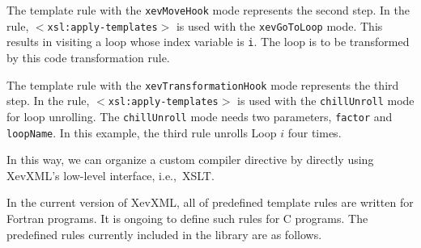 The template rule with the \texttt{xevMoveHook} mode represents the
second step. In the rule, \texttt{$<$xsl:apply-templates$>$} is used
with the \texttt{xevGoToLoop} mode. This results in visiting a loop
whose index variable is \texttt{i}. The loop is to be transformed by
this code transformation rule.

The template rule with the \texttt{xevTransformationHook} mode
represents the third step. In the rule,
\texttt{$<$xsl:apply-templates$>$} is used with the
\texttt{chillUnroll} mode for loop unrolling. The
\texttt{chillUnroll} mode needs two parameters, \texttt{factor} and
\texttt{loopName}. In this example, the third rule unrolls Loop $i$ four
times.

In this way, we can organize a custom compiler directive by directly
using XevXML's low-level interface, i.e.,~XSLT.

In the current version of XevXML, all of predefined template rules are
written for Fortran programs. It is ongoing to define such rules for C
programs.  The predefined rules currently included in the library are as
follows.


